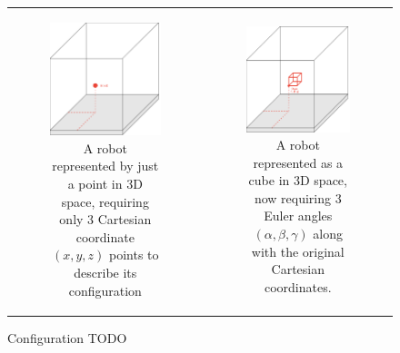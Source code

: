 \begin{figure}[H]
\begin{center}
\begin{tabular}{cc}

    \begin{subfigure}{\textwidth}
    \begin{center}
    \includegraphics[width=0.4\linewidth]{chapters/chapter2/img/motionPlanning/3DPointConfiguration.png}
    \caption{A robot represented by just a point in 3D space, requiring only 3 Cartesian coordinate $(x,y,z)$ points to describe its \gls{configuration}}
    \label{subfig:3DPointConfig}
    \end{center}
    \end{subfigure}
    &
    \begin{subfigure}{\textwidth}
    \begin{center}
    \includegraphics[width=0.4\linewidth]{chapters/chapter2/img/motionPlanning/3DCubeConfiguration.png}
    \caption{A robot represented as a cube in 3D space, now requiring 3 Euler angles $(\alpha, \beta, \gamma)$ along with the original Cartesian coordinates.}
    \label{subfig:3DCubeConfig}
    \end{center}
    \end{subfigure} \\
\end{tabular}
    \caption{Configuration TODO}
    \label{fig:configuration}

\end{center}
\end{figure}